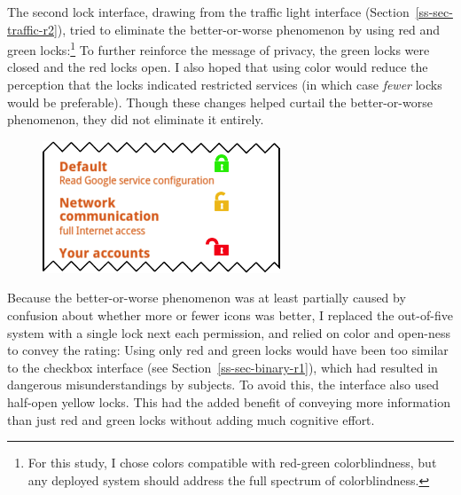 \documentclass[11pt]{article}
\newcommand{\refsec}[1]{Section~\ref{#1}}
\begin{document}
The second lock interface, drawing from the traffic light interface
(\refsec{ss-sec-traffic-r2}), tried to eliminate the better-or-worse 
phenomenon by using red and green locks:\footnote{For this 
  study, I chose colors
  compatible with red-green colorblindness, but any deployed system
  should address the full spectrum of colorblindness.}
\label{ss-sec-locks-r2}
To further reinforce the message of privacy, the 
green locks were closed and the red locks open.
I also hoped that using color would reduce 
the perception that the locks indicated restricted services (in which 
case \emph{fewer} locks would be preferable).
Though these changes helped curtail the better-or-worse phenomenon, they did not 
eliminate it entirely. 


\begin{figure}
\begin{center}
\includegraphics[width=.9\linewidth]{candidate-img/locks/locksR3.png}
\end{center}
\end{figure}

Because the better-or-worse phenomenon was at least partially caused 
by confusion about whether more or fewer icons was better, I 
replaced the out-of-five system with 
a single lock next each permission, and relied on 
color and open-ness to convey the rating:
\label{ss-sec-locks-r3}
Using
only red and green locks would have been too similar to the checkbox
interface (see \refsec{ss-sec-binary-r1}), 
which had resulted in dangerous misunderstandings by subjects. 
To avoid this, the interface also used half-open yellow 
locks. This 
had the added benefit of conveying more 
information than just red and green locks without adding much cognitive 
effort.
\end{document}
